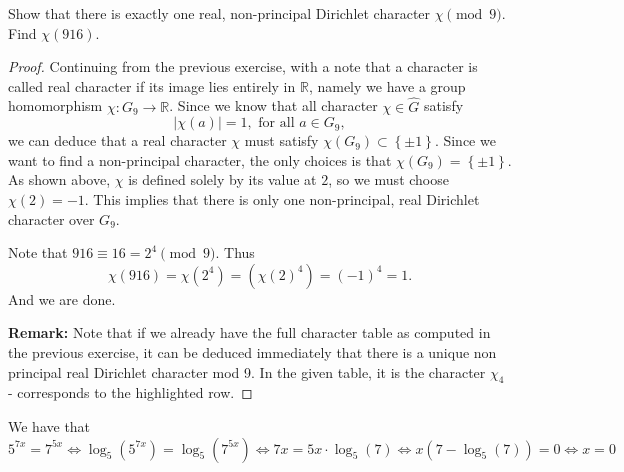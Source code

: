 \documentclass[11pt,letterpaper]{article}
\DeclareMathOperator{\1}{\mathbbm{1}}
\begin{document}
\begin{exercise}
  Show that there is exactly one real, non-principal Dirichlet character $\chi \pmod 9$. Find $\chi(916)$.
\end{exercise}
\begin{proof}
  Continuing from the previous exercise, with a note that a character is called real character if its image lies entirely in
  $\mathbb{R}$, namely  we have a group homomorphism $\chi\colon G_9 \to \mathbb{R}$. Since we know that all character $\chi \in \hat{G}$ satisfy
  \[|\chi(a)| =1, \text{ for all } a \in G_9,\]
  we can deduce that a real character $\chi$ must satisfy $\chi(G_9) \subset \left\lbrace \pm 1 \right\rbrace$. Since
  we want to find a non-principal character, the only choices is that $\chi(G_9) = \left\lbrace \pm 1\right\rbrace$. As shown
  above, $\chi$ is defined solely by its value at $2$, so we must choose $\chi(2) =-1$. This implies that there is only
  one non-principal, real Dirichlet character over $G_9$.

  Note that $916 \equiv 16 = 2^4 \pmod 9$. Thus
  \[ \chi(916) = \chi (2^4) = (\chi(2)^4) = (-1)^4=1.\]
  And we are done.

  \textbf{Remark:} Note that if we already have the full character table as computed in the previous exercise, it can be deduced immediately that
  there is a unique non principal real Dirichlet character mod 9.  In the given table, it is the character $\chi_4$ - corresponds to the highlighted row.
\end{proof}\newpage
We have that
\[5^{7x} = 7^{5x} \Leftrightarrow \log_5(5^{7x})=\log_5(7^{5x}) \Leftrightarrow 7x = 5x\cdot\log_5(7) \Leftrightarrow x(7-\log_5(7))=0 \Leftrightarrow x =0\]
\end{document}
